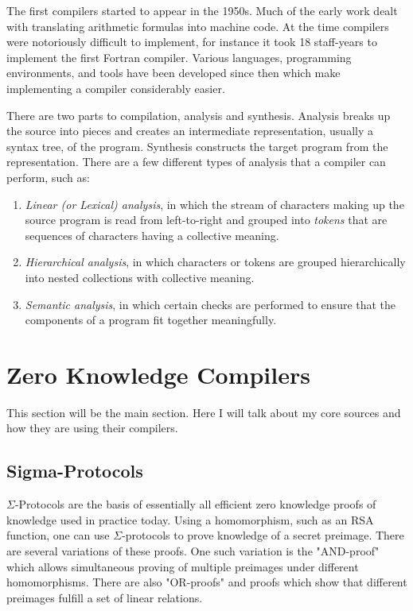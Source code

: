 \documentclass{sig-alternate}
\begin{document}
	The first compilers started to appear in the 1950s. Much of the early work
	dealt with translating arithmetic formulas into machine code. At the time
	compilers were notoriously difficult to implement, for instance it took
	18 staff-years to implement the first Fortran compiler. Various languages,
	programming	environments, and tools have been developed since then which
	make implementing a compiler considerably easier.
	
	There are two parts to compilation, analysis and synthesis. Analysis breaks
	up the source into pieces and creates an intermediate representation, usually
	a syntax tree, of the program. Synthesis constructs the target program from
    the representation. There are a few different types of analysis that a compiler
    can perform, such as:
    
    \begin{enumerate}
    \item \textit{Linear (or Lexical) analysis}, in which the stream of characters
    making up the source program is read from left-to-right and grouped into 
    \textit{tokens} that are sequences of characters having a collective meaning.
    
    \item \textit{Hierarchical analysis}, in which characters or tokens are grouped
    hierarchically into nested collections with collective meaning.
    
    \item \textit{Semantic analysis}, in which certain checks are performed to ensure
    that the components of a program fit together meaningfully.
    \end{enumerate}
    
    

\section{Zero Knowledge Compilers}
	This section will be the main section. Here I will talk about my core sources and
	how they are using their compilers.

	\subsection{Sigma-Protocols}
		$\Sigma$-Protocols are the basis of essentially all efficient zero knowledge
		proofs of knowledge used in practice today. Using a homomorphism, such as an
		RSA function, one can use $\Sigma$-protocols to prove knowledge of a secret
		preimage. There are several variations of these proofs. One such variation is
		the "AND-proof" which allows simultaneous proving of multiple preimages under
		different homomorphisms. There are also "OR-proofs" and proofs which show
		that different preimages fulfill a set of linear relations.~\cite{Sigma:2009}
		
\end{document}
